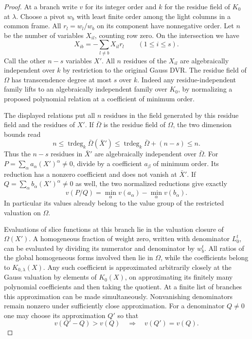 \begin{proof}
At a branch write \(v\) for its integer order and \(k\) for
the residue field of \(K_0\) at \(\lambda\).
Choose a pivot \(w_b\) with least finite order among the
light columns in a common frame. All \(r_l=w_l/w_b\) on
its component have nonnegative order. Let \(n\) be the number
of variables \(X_{il}\), counting row zero. On the intersection
we have
\[
          X_{ib}=-\sum_{l\ne b} X_{il}r_l
                  \qquad(1\le i\le s).
\]
Call the other \(n-s\) variables \(X'\). All \(n\) residues
of the \(X_{il}\) are algebraically independent over \(k\)
by restriction to the original Gauss DVR. The residue field
of \(\Omega\) has transcendence degree at most \(s\) over
\(k\). Indeed any residue-independent family lifts to an
algebraically independent family over \(K_0\), by normalizing
a proposed polynomial relation at a coefficient of minimum order.

The displayed relations put all \(n\) residues in the field
generated by this residue field and the residues of \(X'\).
If \(\bar\Omega\) is the residue field of \(\Omega\), the
two dimension bounds read
\[
 n\le\operatorname{trdeg}_k\bar\Omega(\bar X')
       \le \operatorname{trdeg}_k\bar\Omega+(n-s)\le n.
\]
Thus the \(n-s\) residues in \(\bar X'\) are algebraically
independent over \(\bar\Omega\). For \(P=\sum_\alpha
a_\alpha (X')^\alpha\ne0\), divide by a coefficient \(a_\beta\)
of minimum order. Its reduction has a nonzero coefficient and
does not vanish at \(\bar X'\). If \(Q=\sum_\alpha b_\alpha(X')^\alpha\ne0\) as well, the two
normalized reductions give exactly
\[
 v(P/Q)=\min_\alpha v(a_\alpha)-\min_\alpha v(b_\alpha).
\]
In particular its values already belong to the value group of
the restricted valuation on \(\Omega\).

Evaluations of slice functions at this branch lie in the
valuation closure of \(\Omega(X')\). A homogeneous fraction
of weight zero, written with denominator \(L_0^t\), can be
evaluated by dividing its numerator and denominator by
\(w_b^t\). All ratios of the global homogeneous forms involved
then lie in \(\Omega\), while the coefficients belong to
\(K_{0,\lambda}(X)\). Any such coefficient is approximated
arbitrarily closely at the Gauss valuation by elements
of \(K_0(X)\), on approximating its finitely many polynomial
coefficients and then taking the quotient. At a finite list
of branches this approximation can be made simultaneously.
Nonvanishing denominators remain nonzero under sufficiently
close approximation.
For a denominator \(Q\ne0\) one may choose its approximation \(Q'\) so that
\[
  v(Q'-Q)>v(Q)\quad\Longrightarrow\quad v(Q')=v(Q).
\]


\end{proof}
